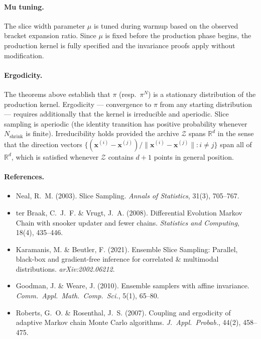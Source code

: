 \documentclass[12pt]{article}
\newcommand{\R}{\mathbb{R}}
\newcommand{\Zmat}{\mathcal{Z}}
\newcommand{\bx}{\mathbf{x}}
\begin{document}
\paragraph{Mu tuning.}
The slice width parameter $\mu$ is tuned during warmup based on the
observed bracket expansion ratio. Since $\mu$ is fixed before the
production phase begins, the production kernel is fully specified and
the invariance proofs apply without modification.

\paragraph{Ergodicity.}
The theorems above establish that $\pi$ (resp.\ $\pi^N$) is a
stationary distribution of the production kernel. Ergodicity ---
convergence to $\pi$ from any starting distribution --- requires
additionally that the kernel is irreducible and aperiodic. Slice
sampling is aperiodic (the identity transition has positive probability
whenever $N_{\mathrm{shrink}}$ is finite). Irreducibility holds
provided the archive $\Zmat$ spans $\R^d$ in the sense that the
direction vectors $\{(\bx^{(i)} - \bx^{(j)}) / \|\bx^{(i)} -
\bx^{(j)}\| : i \neq j\}$ span all of $\R^d$, which is satisfied
whenever $\Zmat$ contains $d + 1$ points in general position.

\paragraph{References.}
\begin{itemize}
    \item Neal, R.~M. (2003). Slice Sampling. \textit{Annals of Statistics}, 31(3), 705--767.
    \item ter Braak, C.~J.~F. \& Vrugt, J.~A. (2008). Differential Evolution Markov Chain
          with snooker updater and fewer chains. \textit{Statistics and Computing}, 18(4), 435--446.
    \item Karamanis, M. \& Beutler, F. (2021). Ensemble Slice Sampling: Parallel, black-box
          and gradient-free inference for correlated \& multimodal distributions.
          \textit{arXiv:2002.06212}.
    \item Goodman, J. \& Weare, J. (2010). Ensemble samplers with affine invariance.
          \textit{Comm.\ Appl.\ Math.\ Comp.\ Sci.}, 5(1), 65--80.
    \item Roberts, G.~O. \& Rosenthal, J.~S. (2007). Coupling and ergodicity of adaptive
          Markov chain Monte Carlo algorithms. \textit{J.\ Appl.\ Probab.}, 44(2), 458--475.
\end{itemize}
\end{document}
